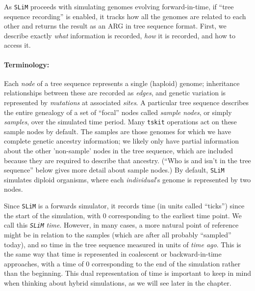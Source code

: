 \documentclass[12pt]{article}
\newcommand{\tskit}[0]{\texttt{tskit}\xspace}
\newcommand{\slim}[0]{\texttt{SLiM}\xspace}
\begin{document}
As \slim proceeds with simulating genomes evolving forward-in-time, 
if ``tree sequence recording'' is enabled,
it tracks how all the genomes are
related to each other and returns the result as an ARG in tree sequence format. First, we describe
exactly \emph{what} information is recorded, \emph{how} it is recorded, and how to access it.

\paragraph{Terminology:}
Each \textit{node} of a tree sequence represents a single (haploid) genome;
inheritance relationships between these are recorded as \textit{edges},
and genetic variation is represented by \textit{mutations} at associated \textit{sites}.
A particular tree sequence describes the entire genealogy of a set of ``focal'' nodes called
\textit{sample nodes}, or simply \textit{samples}, over the simulated time period.
Many \tskit operations act on these sample nodes by default.
The samples are those genomes for which we have complete genetic ancestry information; 
we likely only have partial information about the other 'non-sample' nodes in the tree sequence,
which are included because they are required to describe that ancestry.
(``Who is and isn't in the tree sequence'' below gives more detail about sample nodes.)
By default, \slim simulates diploid organisms, where each \textit{individual}'s genome is represented by two nodes.

Since \slim is a forwards simulator, it records time (in units called ``ticks'')
since the start of the simulation, with 0 corresponding to the earliest time point.
We call this \textit{\slim time}.
However, in many cases, a more natural point of reference might be in relation to the samples
(which are after all probably ``sampled'' today),
and so time in the tree sequence measured in units of \textit{time ago}.
This is the same way that time
is represented in coalescent or backward-in-time approaches, with a time of 0 corresponding
to the end of the simulation rather than the beginning.
This dual representation of time is important
to keep in mind when thinking about hybrid simulations, as we will see later in the chapter.
\end{document}
